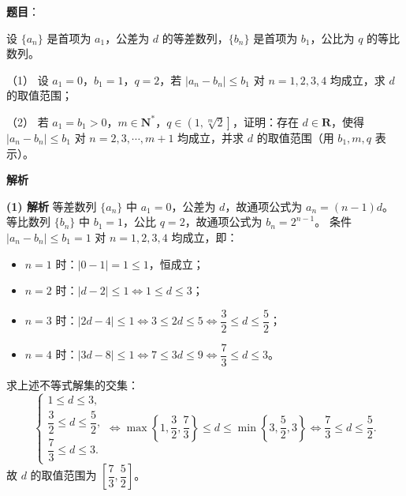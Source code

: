 \begin{answer}

\textbf{题目}：

设 $\{a_n\}$ 是首项为 $a_1$，公差为 $d$ 的等差数列，$\{b_n\}$ 是首项为 $b_1$，公比为 $q$ 的等比数列。

（1） 设 $a_1 = 0$，$b_1 = 1$，$q = 2$，若 $|a_n - b_n| \leqslant b_1$ 对 $n = 1, 2, 3, 4$ 均成立，求 $d$ 的取值范围；

（2） 若 $a_1 = b_1 > 0$，$m \in \mathbf{N}^*$，$q \in \left(1, \sqrt[m]{2}\right]$，证明：存在 $d \in \mathbf{R}$，使得 $|a_n - b_n| \leqslant b_1$ 对 $n = 2, 3, \cdots, m + 1$ 均成立，并求 $d$ 的取值范围（用 $b_1, m, q$ 表示）。

\textbf{解析}

\textbf{(1) 解析}
等差数列 $\{a_n\}$ 中 $a_1 = 0$，公差为 $d$，故通项公式为 $a_n = (n - 1)d$。
等比数列 $\{b_n\}$ 中 $b_1 = 1$，公比 $q = 2$，故通项公式为 $b_n = 2^{n-1}$。
条件 $|a_n - b_n| \leqslant b_1 = 1$ 对 $n = 1, 2, 3, 4$ 均成立，即：
\begin{itemize}
\item $n = 1$ 时：$|0 - 1| = 1 \leqslant 1$，恒成立；
\item $n = 2$ 时：$|d - 2| \leqslant 1 \iff 1 \leqslant d \leqslant 3$；
\item $n = 3$ 时：$|2d - 4| \leqslant 1 \iff 3 \leqslant 2d \leqslant 5 \iff \dfrac{3}{2} \leqslant d \leqslant \dfrac{5}{2}$；
\item $n = 4$ 时：$|3d - 8| \leqslant 1 \iff 7 \leqslant 3d \leqslant 9 \iff \dfrac{7}{3} \leqslant d \leqslant 3$。
\end{itemize}
求上述不等式解集的交集：
\nopagebreak[4]
\[\begin{cases} 1 \leqslant d \leqslant 3, \\ \dfrac{3}{2} \leqslant d \leqslant \dfrac{5}{2}, \\ \dfrac{7}{3} \leqslant d \leqslant 3. \end{cases} \iff \max\left\{1, \frac{3}{2}, \frac{7}{3}\right\} \leqslant d \leqslant \min\left\{3, \frac{5}{2}, 3\right\} \iff \frac{7}{3} \leqslant d \leqslant \frac{5}{2}.\]
故 $d$ 的取值范围为 $\left[\dfrac{7}{3}, \dfrac{5}{2}\right]$。


\end{answer}
